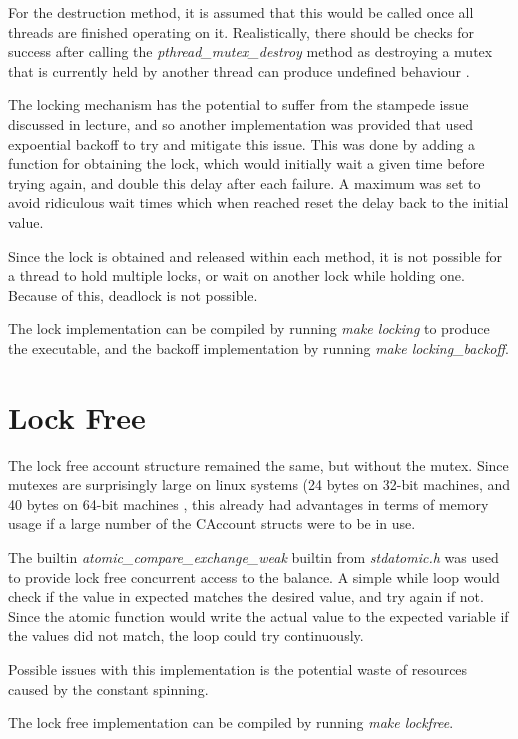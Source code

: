 \documentclass[12pt]{article}
\begin{document}
For the destruction method, it is assumed that this would be called once all threads are finished operating on it. Realistically, there should be checks for success after calling the \emph{pthread\_mutex\_destroy} method as destroying a mutex that is currently held by another thread can produce undefined behaviour \cite{mutexUndefined}.

The locking mechanism has the potential to suffer from the stampede issue discussed in lecture, and so another implementation was provided that used expoential backoff to try and mitigate this issue. This was done by adding a function for obtaining the lock, which would initially wait a given time before trying again, and double this delay after each failure. A maximum was set to avoid ridiculous wait times which when reached reset the delay back to the initial value.

Since the lock is obtained and released within each method, it is not possible for a thread to hold multiple locks, or wait on another lock while holding one. Because of this, deadlock is not possible. 

The lock implementation can be compiled by running \emph{make locking} to produce the executable, and the backoff implementation by running \emph{make locking\_backoff}. 

\part{Lock Free}

The lock free account structure remained the same, but without the mutex. Since mutexes are surprisingly large on linux systems (24 bytes on 32-bit machines, and 40 bytes on 64-bit machines \cite{mutexSize}, this already had advantages in terms of memory usage if a large number of the CAccount structs were to be in use. 

The builtin \emph{atomic\_compare\_exchange\_weak} builtin from \emph{stdatomic.h} was used to provide lock free concurrent access to the balance. A simple while loop would check if the value in expected matches the desired value, and try again if not. Since the atomic function would write the actual value to the expected variable if the values did not match, the loop could try continuously.

Possible issues with this implementation is the potential waste of resources caused by the constant spinning.

The lock free implementation can be compiled by running \emph{make lockfree}.
\end{document}
